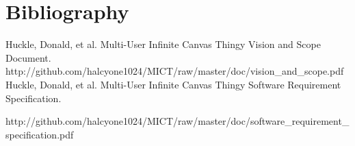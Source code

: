 \documentclass[11pt,oneside,a4paper]{article}
\begin{document}
\section{Bibliography}
Huckle, Donald, et al. Multi-User Infinite Canvas Thingy Vision and
Scope Document. http://github.com/halcyone1024/MICT/raw/master/doc/vision\_and\_scope.pdf
Huckle, Donald, et al. Multi-User Infinite Canvas Thingy Software Requirement
Specification.

http://github.com/halcyone1024/MICT/raw/master/doc/software\_requirement\_specification.pdf
\end{document}
